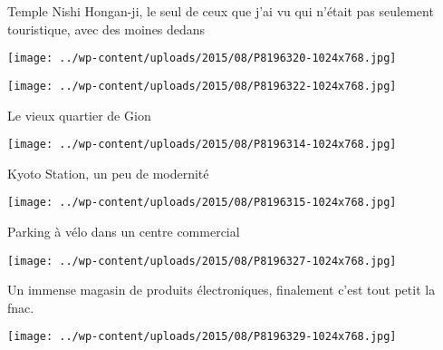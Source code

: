  

 Temple Nishi Hongan-ji, le seul de ceux que j'ai vu qui n'était pas seulement touristique, avec des moines dedans 

 

\begin{center} \texttt{[image: ../wp-content/uploads/2015/08/P8196320-1024x768.jpg]} \end{center}

 

 

\begin{center} \texttt{[image: ../wp-content/uploads/2015/08/P8196322-1024x768.jpg]} \end{center}

 

 Le vieux quartier de Gion 

 

\begin{center} \texttt{[image: ../wp-content/uploads/2015/08/P8196314-1024x768.jpg]} \end{center}

 

 Kyoto Station, un peu de modernité 

 

\begin{center} \texttt{[image: ../wp-content/uploads/2015/08/P8196315-1024x768.jpg]} \end{center}

 

 Parking à vélo dans un centre commercial 

 

\begin{center} \texttt{[image: ../wp-content/uploads/2015/08/P8196327-1024x768.jpg]} \end{center}

 

 Un immense magasin de produits électroniques, finalement c'est tout petit la fnac. 

 

\begin{center} \texttt{[image: ../wp-content/uploads/2015/08/P8196329-1024x768.jpg]} \end{center}




 
 

